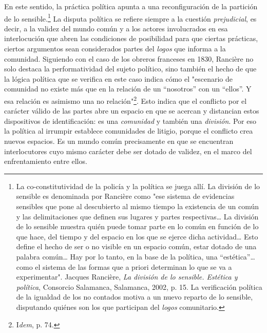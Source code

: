 \documentclass{book}
\begin{document}
En este sentido, la práctica política apunta a una reconfiguración de la
partición de lo sensible.\footnote{La co-constitutividad de la policía y
  la política se juega allí. La división de lo sensible es denominada
  por Rancière como "ese sistema de evidencias sensibles que pone al
  descubierto al mismo tiempo la existencia de un común y las
  delimitaciones que definen sus lugares y partes respectivas\ldots{} La
  división de lo sensible muestra quién puede tomar parte en lo común en
  función de lo que hace, del tiempo y del espacio en los que se ejerce
  dicha actividad\ldots{} Esto define el hecho de ser o no visible en un
  espacio común, estar dotado de una palabra común\ldots{} Hay por lo
  tanto, en la base de la política, una ``estética''\ldots{} como el
  sistema de las formas que a priori determinan lo que se va a
  experimentar". Jacques Rancière, \emph{La división de lo sensible.
  Estética y política}, Consorcio Salamanca, Salamanca, 2002, p. 15. La
  verificación política de la igualdad de los no contados motiva a un
  nuevo reparto de lo sensible, disputando quiénes son los que
  participan del \emph{logos} comunitario.} La disputa política se
refiere siempre a la cuestión \emph{prejudicial}, es decir, a la validez
del mundo común y a los actores involucrados en esa interlocución que
abren las condiciones de posibilidad para que ciertas prácticas, ciertos
argumentos sean considerados partes del \emph{logos} que informa a la
comunidad. Siguiendo con el caso de los obreros franceses en 1830,
Rancière no solo destaca la performatividad del sujeto político, sino
también el hecho de que la lógica política que se verifica en este caso
indica cómo el "escenario de comunidad no existe más que en la relación
de un ``nosotros'' con un ``ellos''. Y esa relación es asimismo una no
relación"\footnote{I\emph{dem}, p. 74.}. Esto indica que el conflicto
por el carácter válido de las partes abre un espacio en que se acercan y
distancian estos dispositivos de identificación: es una \emph{comunidad}
y también una \emph{división}. Por eso la política al irrumpir establece
comunidades de litigio, porque el conflicto crea nuevos espacios. Es un
mundo común precisamente en que se encuentran interlocutores cuyo mismo
carácter debe ser dotado de validez, en el marco del enfrentamiento
entre ellos.
\end{document}

